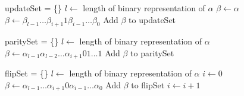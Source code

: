 \begin{algorithm}[htbp]
\caption{\textsc{GenerateUpdateSet}\label{GenerateUpdateSet}}
\begin{algorithmic}[1]
\State updateSet = \{\}
\State $l \gets $ length of binary representation of $\alpha$
\State $\beta \gets \alpha$
        \State $\beta \gets \beta_{l-1}\ldots\beta_{i+1}1\beta_{i-1}\ldots\beta_0$
            \State Add $\beta$ to updateSet
        \EndIf
    \EndIf
\EndFor

\end{algorithmic}
\end{algorithm}

\begin{algorithm}[htbp]
    \caption{\label{GenerateParitySet}\textsc{GenerateParitySet}}
\begin{algorithmic}[1]
\State paritySet = \{\}
\State $l \gets $ length of binary representation of $\alpha$
        \State $\beta \gets \alpha_{l-1}\alpha_{l-2}\ldots\alpha_{i+1}01\ldots 1$
        \State Add $\beta$ to paritySet 
    \EndIf
\EndFor
\end{algorithmic}
\end{algorithm}
\begin{algorithm}[htbp]
    \caption{\label{GenerateFlipSet}\textsc{GenerateFlipSet}}
\begin{algorithmic}[1]
\State flipSet = \{\}
\State $l \gets $ length of binary representation of $\alpha$
\State $i \gets 0$
    \State $\beta \gets \alpha_{l-1}\ldots \alpha_{i+1}0\alpha_{i-1} \ldots \alpha_0$
    \State Add $\beta$ to flipSet
    \State $i \gets i + 1$
\EndWhile
\end{algorithmic}
\end{algorithm}

